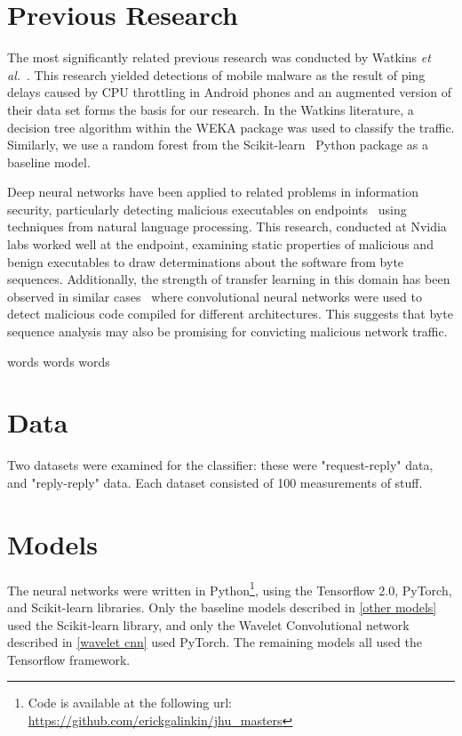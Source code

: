 \documentclass[10pt]{article}
\begin{document}
\section{Previous Research}
The most significantly related previous research was conducted by Watkins \textit{et al.}~\cite{watkins2018network}.
This research yielded detections of mobile malware as the result of ping delays caused by CPU throttling in Android phones and an augmented version of their data set forms the basis for our research.
In the Watkins literature, a decision tree algorithm within the WEKA package was used to classify the traffic.
Similarly, we use a random forest from the Scikit-learn~\cite{scikit-learn} Python package as a baseline model.

Deep neural networks have been applied to related problems in information security, particularly detecting malicious executables on endpoints~\cite{raff2018malware} using techniques from natural language processing.
This research, conducted at Nvidia labs worked well at the endpoint, examining static properties of malicious and benign executables to draw determinations about the software from byte sequences.
Additionally, the strength of transfer learning in this domain has been observed in similar cases~\cite{galinkin2019shape} where convolutional neural networks were used to detect malicious code compiled for different architectures.
This suggests that byte sequence analysis may also be promising for convicting malicious network traffic.

words words words 

\section{Data}
Two datasets were examined for the classifier: these were "request-reply" data, and "reply-reply" data.
Each dataset consisted of 100 measurements of stuff.

\section{Models}
The neural networks were written in Python\footnote{Code is available at the following url: \url{https://github.com/erickgalinkin/jhu_masters}}, using the Tensorflow 2.0, PyTorch, and Scikit-learn libraries.
Only the baseline models described in \ref{other models} used the Scikit-learn library, and only the Wavelet Convolutional network described in \ref{wavelet cnn} used PyTorch.
The remaining models all used the Tensorflow framework.
\end{document}
